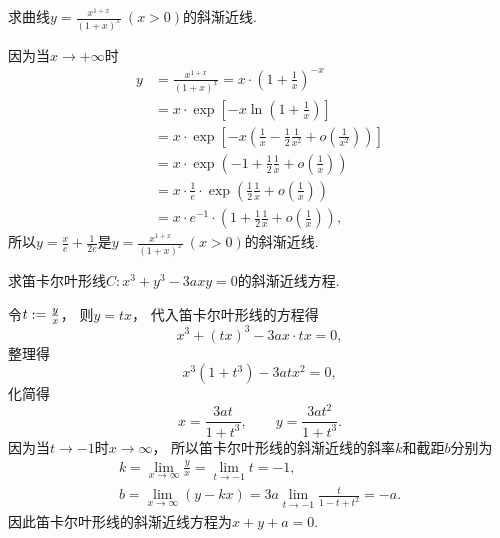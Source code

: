 \begin{example}
求曲线\(y = \frac{x^{1+x}}{(1+x)^x}\ (x>0)\)的斜渐近线.
\begin{solution}
因为当\(x\to+\infty\)时\begin{align*}
	y &= \frac{x^{1+x}}{(1+x)^x}
	= x \cdot \left( 1 + \frac1x \right)^{-x} \\
	&= x \cdot \exp[-x \ln(1 + \frac1x)] \\
	&= x \cdot \exp[-x \left( \frac1x - \frac12 \frac1{x^2} + o\left(\frac1{x^2}\right) \right)] \\
	&= x \cdot \exp\left( -1 + \frac12 \frac1x + o\left(\frac1x\right) \right) \\
	&= x \cdot \frac1e \cdot \exp\left( \frac12 \frac1x + o\left( \frac1x \right) \right) \\
	&= x \cdot e^{-1} \cdot \left( 1 + \frac12 \frac1x + o\left(\frac1x\right) \right),
\end{align*}
所以\(y = \frac{x}{e} + \frac1{2e}\)是\(y = \frac{x^{1+x}}{(1+x)^x}\ (x>0)\)的斜渐近线.
\end{solution}
\end{example}

\begin{example}
求笛卡尔叶形线\(C: x^3+y^3-3axy=0\)的斜渐近线方程.
\begin{solution}
令\(t := \frac{y}{x}\)，
则\(y = tx\)，
代入笛卡尔叶形线的方程得\begin{equation*}
	x^3+(tx)^3-3ax \cdot tx = 0,
\end{equation*}
整理得\begin{equation*}
	x^3(1+t^3)-3atx^2=0,
\end{equation*}
化简得\begin{equation*}
	x = \frac{3at}{1+t^3},
	\qquad
	y = \frac{3at^2}{1+t^3}.
\end{equation*}
因为当\(t\to-1\)时\(x\to\infty\)，
所以笛卡尔叶形线的斜渐近线的斜率\(k\)和截距\(b\)分别为\begin{gather*}
	k = \lim_{x\to\infty} \frac{y}{x}
	= \lim_{t\to-1} t
	= -1, \\
	b = \lim_{x\to\infty} (y-kx)
	= 3a \lim_{t\to-1} \frac{t}{1-t+t^2}
	= -a.
\end{gather*}
因此笛卡尔叶形线的斜渐近线方程为\(x+y+a=0\).
\end{solution}
\end{example}

